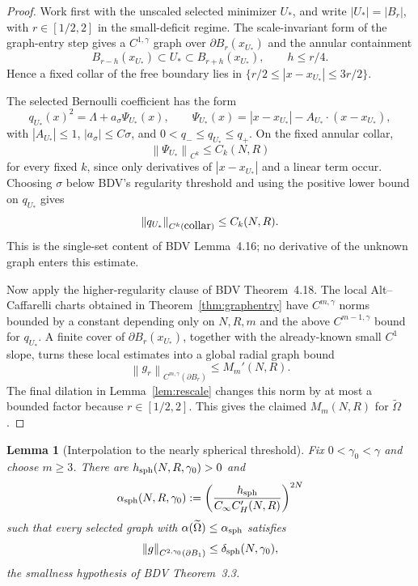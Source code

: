 \documentclass[11pt]{article}
\newtheorem{lemma}[theorem]{Lemma}
\theoremstyle{definition}
\newcommand{\norm}[1]{\left\|#1\right\|}
\newcommand{\abs}[1]{\left|#1\right|}
\begin{document}
\begin{proof}
Work first with the unscaled selected minimizer $U_*$, and write
$\abs{U_*}=\abs{B_r}$, with $r\in[1/2,2]$ in the small-deficit regime. The
scale-invariant form of the graph-entry step gives a $C^{1,\gamma}$ graph over
$\partial B_r(x_{U_*})$ and
the annular containment
\[
B_{r-h}(x_{U_*})\subset U_*\subset B_{r+h}(x_{U_*}),\qquad h\le r/4.
\]
Hence a fixed collar of the free boundary lies in
$\{r/2\le\abs{x-x_{U_*}}\le3r/2\}$.

The selected Bernoulli coefficient has the form
\[
q_{U_*}(x)^2=\Lambda+a_\sigma\Psi_{U_*}(x),\qquad
\Psi_{U_*}(x)=\abs{x-x_{U_*}}-A_{U_*}\cdot(x-x_{U_*}),
\]
with $\abs{A_{U_*}}\le1$, $\abs{a_\sigma}\le C\sigma$, and
$0<q_-\le q_{U_*}\le q_+$. On the fixed annular collar,
\[
\norm{\Psi_{U_*}}_{C^k}\le C_k(N,R)
\]
for every fixed $k$, since only derivatives of $\abs{x-x_{U_*}}$ and a linear
term occur. Choosing $\sigma$ below BDV's regularity threshold and using the
positive lower bound on $q_{U_*}$ gives
\[
\norm{q_{U_*}}_{C^k(\hbox{\rm collar})}\le C_k(N,R).
\]
This is the single-set content of BDV Lemma~4.16; no derivative of the unknown
graph enters this estimate.

Now apply the higher-regularity clause of BDV Theorem~4.18. The local
Alt--Caffarelli charts obtained in Theorem~\ref{thm:graphentry} have
$C^{m,\gamma}$ norms bounded by a constant depending only on
$N,R,m$ and the above $C^{m-1,\gamma}$ bound for $q_{U_*}$. A finite cover of
$\partial B_r(x_{U_*})$, together with the already-known small $C^1$ slope,
turns these local estimates into a global radial graph bound
\[
\norm{g_r}_{C^{m,\gamma}(\partial B_r)}\le M_m'(N,R).
\]
The final dilation in Lemma~\ref{lem:rescale} changes this norm by at most a
bounded factor because $r\in[1/2,2]$. This gives the claimed $M_m(N,R)$ for
$\widetilde\Omega$.
\end{proof}

\begin{lemma}[Interpolation to the nearly spherical threshold]\label{lem:interp}
Fix $0<\gamma_0<\gamma$ and choose $m\ge3$. There are
$h_{\rm sph}(N,R,\gamma_0)>0$ and
\[
\alpha_{\rm sph}(N,R,\gamma_0)
:=\left(\frac{h_{\rm sph}}{C_\infty C_H'(N,R)}\right)^{2N}
\]
such that every selected graph with
$\alpha(\widetilde\Omega)\le\alpha_{\rm sph}$ satisfies
\[
\norm{g}_{C^{2,\gamma_0}(\partial B_1)}
\le \delta_{\rm sph}(N,\gamma_0),
\]
the smallness hypothesis of BDV Theorem~3.3.
\end{lemma}
\end{document}
